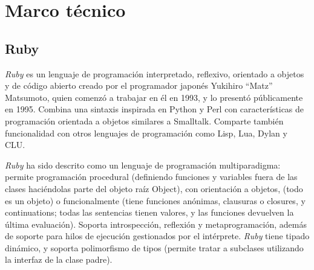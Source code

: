 \chapter{Marco técnico}

\section{Ruby}

\emph{Ruby} \cite{ruby} es un lenguaje de programación interpretado, reflexivo, orientado a objetos y de código abierto creado por el programador japonés Yukihiro ``Matz'' Matsumoto, quien comenzó a trabajar en él en 1993, y lo presentó públicamente en 1995. Combina una sintaxis inspirada en Python y Perl con características de programación orientada a objetos similares a Smalltalk. Comparte también funcionalidad con otros lenguajes de programación como Lisp, Lua, Dylan y CLU. 

\emph{Ruby} ha sido descrito como un lenguaje de programación multiparadigma: permite programación procedural (definiendo funciones y variables fuera de las clases haciéndolas parte del objeto raíz Object), con orientación a objetos, (todo es un objeto) o funcionalmente (tiene funciones anónimas, clausuras o closures, y continuations; todas las sentencias tienen valores, y las funciones devuelven la última evaluación). Soporta introspección, reflexión y metaprogramación, además de soporte para hilos de ejecución gestionados por el intérprete. \emph{Ruby} tiene tipado dinámico, y soporta polimorfismo de tipos (permite tratar a subclases utilizando la interfaz de la clase padre).

